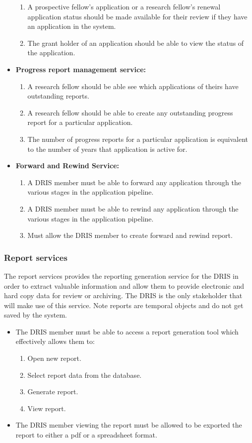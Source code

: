 \documentclass[12pt]{article}
\begin{document}
\begin{itemize}
		\begin{enumerate}
			\item A prospective fellow's application or a research fellow's renewal application status should be made available for their review if they have an application in the system.
			\item The grant holder of an application should be able to view the status of the application.			
		\end{enumerate}
		\item\textbf{Progress report management service:}
		\begin{enumerate}
			\item A research fellow should be able see which applications of theirs have outstanding reports. 
			\item A research fellow should be able to create any outstanding progress report for a particular application. 
			\item The number of progress reports for a particular application is equivalent to the number of years that application is active for.			
		\end{enumerate}
		\item\textbf{Forward and Rewind Service:}
		\begin{enumerate}
			\item A DRIS member must be able to forward any application through the various stages in the application pipeline. 
			\item A DRIS member must be able to rewind any application through the various stages in the application pipeline.  
			\item Must allow the DRIS member to create forward and rewind report.		
		\end{enumerate}		
	\end{itemize}

\subsubsection{Report services}
	The report services provides the reporting generation service for the DRIS in order to extract valuable information and allow them to provide electronic and hard copy data for review or archiving. The DRIS is the only stakeholder that will make use of this service. Note reports are temporal objects and do not get saved by the system.
	\begin{itemize}
		\item The DRIS member must be able to access a report generation tool which effectively allows them to:
		\begin{enumerate}
			\item Open new report.
			\item Select report data from the database.
			\item Generate report.
			\item View report.
		\end{enumerate}
		\item The DRIS member viewing the report must be allowed to be exported the report to either a pdf or a spreadsheet format.	
	\end{itemize}
\end{document}
